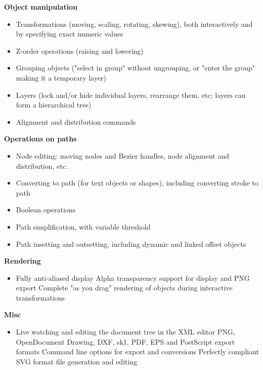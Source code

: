 \textbf{Object manipulation}


\begin{itemize}
\item     Transformations (moving, scaling, rotating, skewing), both interactively and by specifying exact numeric values
\item     Z-order operations (raising and lowering)
\item     Grouping objects ("select in group" without ungrouping, or "enter the group" making it a temporary layer)
\item     Layers (lock and/or hide individual layers, rearrange them, etc; layers can form a hierarchical tree)
\item     Alignment and distribution commands
\end{itemize}


\textbf{Operations on paths}
  
\begin{itemize}
\item    Node editing: moving nodes and Bezier handles, node alignment and distribution, etc.
\item       Converting to path (for text objects or shapes), including converting stroke to path
\item     Boolean operations
\item     Path simplification, with variable threshold
\item       Path insetting and outsetting, including dynamic and linked offset objects
\end{itemize}


\textbf{Rendering}

\begin{itemize}
\item     Fully anti-aliased display
    Alpha transparency support for display and PNG export
    Complete "as you drag" rendering of objects during interactive transformations
\end{itemize}

\textbf{Misc}
 
\begin{itemize}
\item    Live watching and editing the document tree in the XML editor
    PNG, OpenDocument Drawing, DXF, sk1, PDF, EPS and PostScript export formats
    Command line options for export and conversions
    Perfectly compliant SVG format file generation and editing
\end{itemize}



